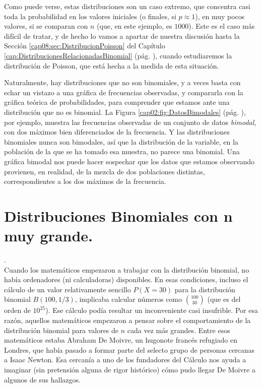 \begin{enumerate}
      Como puede verse, estas distribuciones son un caso extremo, que concentra casi toda la probabilidad en los valores iniciales (o finales, si $p\approx 1$), en muy pocos valores, si se comparan con $n$ (que, en este ejemplo, es $1000$). Este es el caso más difícil de tratar, y de hecho lo vamos a apartar de nuestra discusión hasta la Sección \ref{cap08:sec:DistribucionPoisson} del Capítulo \ref{cap:DistribucionesRelacionadasBinomial} (pág. \pageref{cap08:sec:DistribucionPoisson}), cuando estudiaremos la distribución de Poisson, que está hecha a la medida de esta situación.
\end{enumerate}

Naturalmente, hay distribuciones que no son binomiales, y a veces basta con echar un vistazo a una gráfica de frecuencias observadas, y compararla con la gráfica teórica de probabilidades, para comprender que estamos ante una distribución que no es binomial. La Figura \ref{cap02:fig:DatosBimodales} (pág. \pageref{cap02:fig:DatosBimodales}), por ejemplo, muestra las frecuencias observadas de un conjunto de datos {\em bimodal}, con dos máximos bien diferenciados de la frecuencia. Y las distribuciones binomiales nunca son bimodales, así que la distribución de la variable, en la población de la que se ha tomado esa muestra, no parece una binomial. Una gráfica bimodal nos puede hacer sospechar que los datos que estamos observando provienen, en realidad, de la mezcla de dos poblaciones distintas, correspondientes a los dos máximos de la frecuencia.

\section{Distribuciones Binomiales con n muy grande.}\label{sec:DistribucionesBinomialesnGrande}


.\\

Cuando los matemáticos empezaron a trabajar con la distribución binomial, no había ordenadores (ni calculadoras) disponibles. En esas condiciones, incluso el cálculo de un valor relativamente sencillo $P(X=30)$ para la distribución binomial $B(100,1/3)$, implicaba calcular números como $\binom{100}{30}$ (que es del orden de $10^{25}$). Ese cálculo podía resultar un inconveniente casi insufrible. Por esa razón, aquellos matemáticos empezaron a pensar sobre el comportamiento de la distribución binomial para valores de $n$ cada vez más grandes. Entre esos matemáticos estaba Abraham De Moivre, un hugonote francés refugiado en Londres, que había pasado a formar parte del selecto grupo de personas cercanas a Isaac Newton. Esa cercanía a uno de los fundadores del Cálculo nos ayuda a imaginar (sin pretensión alguna de rigor histórico) cómo pudo llegar De Moivre a algunos de sus hallazgos.

